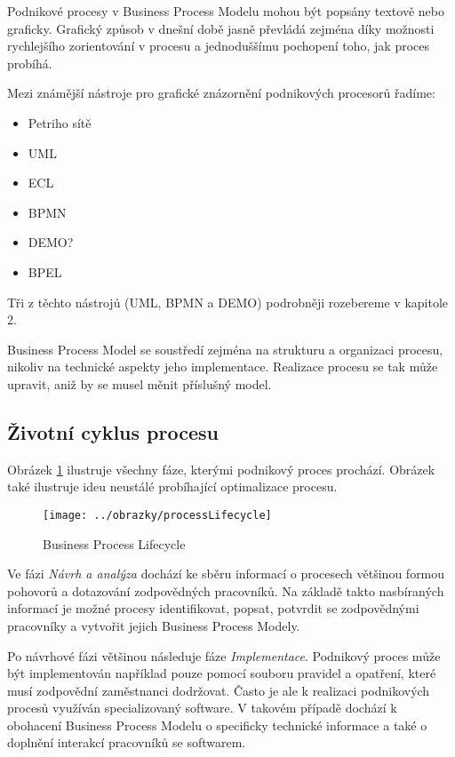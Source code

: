 \documentclass[]{article}
\begin{document}
Podnikové procesy v Business Process Modelu mohou být popsány textově nebo graficky. Grafický způsob v dnešní době jasně převládá zejména díky možnosti rychlejšího zorientování v procesu a jednoduššímu pochopení toho, jak proces probíhá.

Mezi známější nástroje pro grafické znázornění podnikových procesorů řadíme: \cite{Naplava2015}
\begin{itemize}
\item Petriho sítě
\item UML
\item ECL
\item BPMN
\item DEMO?
\item BPEL
\end{itemize}

Tři z těchto nástrojů (UML, BPMN a DEMO) podrobněji rozebereme v kapitole 2. %

Business Process Model se soustředí zejména na strukturu a organizaci procesu, nikoliv na technické aspekty jeho implementace. Realizace procesu se tak může upravit, aniž by se musel měnit příslušný model.

\subsection{Životní cyklus procesu}
Obrázek \ref{fig:BusinessProcessLifecycle} ilustruje všechny fáze, kterými podnikový proces prochází. Obrázek také ilustruje ideu neustálé probíhající optimalizace procesu.

\begin{figure}[H]\centering %
\texttt{[image: ../obrazky/processLifecycle]}
\caption{Business Process Lifecycle \cite{Weske2007}}
\label{fig:BusinessProcessLifecycle}
\end{figure}

Ve fázi \textit{Návrh a analýza} dochází ke sběru informací o procesech většinou formou pohovorů a dotazování zodpovědných pracovníků. Na základě takto nasbíraných informací je možné procesy identifikovat, popsat, potvrdit se zodpovědnými pracovníky a vytvořit jejich Business Process Modely.

Po návrhové fázi většinou následuje fáze \textit{Implementace}. Podnikový proces může být implementován například pouze  pomocí souboru pravidel a opatření, které musí zodpovědní zaměstnanci dodržovat. Často je ale k realizaci podnikových procesů využíván specializovaný software. V takovém případě dochází k obohacení Business Process Modelu o specificky technické informace a také o doplnění interakcí pracovníků se softwarem.
\end{document}
